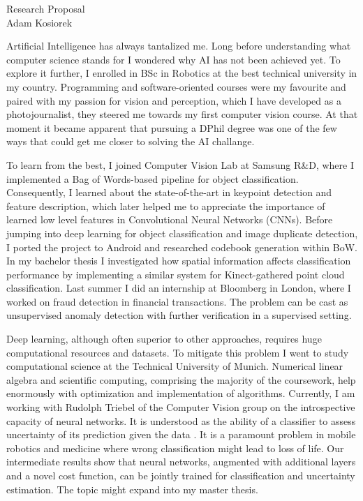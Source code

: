 \documentclass[12pt]{article}
\begin{document}
\begin{center}
{\Large Research Proposal} \\[.1in]
{\large Adam Kosiorek}
\end{center}

\vspace*{.1in}

Artificial Intelligence has always tantalized me. Long before understanding what computer science stands for I wondered why AI has not been achieved yet. To explore it further, I enrolled in BSc in Robotics at the best technical university in my country. Programming and software-oriented courses were my favourite and paired with my passion for vision and perception, which I have developed as a photojournalist, they steered me towards my first computer vision course. At that moment it became apparent that pursuing a DPhil degree was one of the few ways that could get me closer to solving the AI challange.

To learn from the best, I joined Computer Vision Lab at Samsung R\&D, where I implemented a Bag of Words-based pipeline for object classification. Consequently, I learned about the state-of-the-art in keypoint detection and feature description, which later helped me to appreciate the importance of learned low level features in Convolutional Neural Networks (CNNs). Before jumping into deep learning for object classification and image duplicate detection, I ported the project to Android and researched codebook generation within BoW. In my bachelor thesis I investigated how spatial information affects classification performance by implementing a similar system for Kinect-gathered point cloud classification. Last summer I did an internship at Bloomberg in London, where I worked on fraud detection in financial transactions. The problem can be cast as unsupervised anomaly detection with further verification in a supervised setting.


Deep learning, although often superior to other approaches, requires huge computational resources and datasets. To mitigate this problem I went to study computational science at the Technical University of Munich. Numerical linear algebra and scientific computing, comprising the majority of the coursework, help enormously with optimization and implementation of algorithms. Currently, I am working with Rudolph Triebel of the Computer Vision group on the introspective capacity of neural networks. It is understood as the ability of a classifier to assess uncertainty of its prediction given the data \cite{introspective}. It is a paramount problem in mobile robotics and medicine where wrong classification might lead to loss of life. Our intermediate results show that neural networks, augmented with additional layers and a novel cost function, can be jointly trained for classification and uncertainty estimation. The topic might expand into my master thesis.
\end{document}
